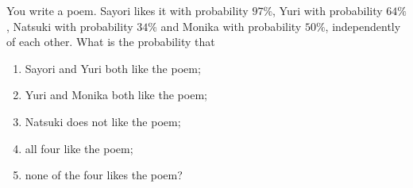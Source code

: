 You write a poem. Sayori likes it with probability $97\%$, Yuri with probability $64\%$, Natsuki with probability $34\%$ and Monika with probability $50\%$, independently of each other. What is the probability that
\begin{enumerate}
\item[(a)] Sayori and Yuri both like the poem;
\item[(b)] Yuri and Monika both like the poem;
\item[(c)] Natsuki does not like the poem;
\item[(d)] all four like the poem;
\item[(e)] none of the four likes the poem?
\end{enumerate}
